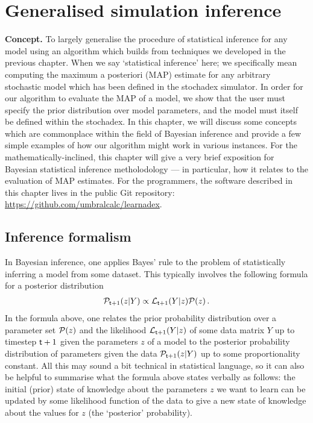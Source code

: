 \chapter{\sffamily Generalised simulation inference}

{\bfseries\sffamily Concept.} To largely generalise the procedure of statistical inference for any model using an algorithm which builds from techniques we developed in the previous chapter. When we say `statistical inference' here; we specifically mean computing the maximum a posteriori (MAP) estimate for any arbitrary stochastic model which has been defined in the stochadex simulator. In order for our algorithm to evaluate the MAP of a model, we show that the user must specify the prior distribution over model parameters, and the model must itself be defined within the stochadex. In this chapter, we will discuss some concepts which are commonplace within the field of Bayesian inference and provide a few simple examples of how our algorithm might work in various instances. For the mathematically-inclined, this chapter will give a very brief exposition for Bayesian statistical inference metholodology --- in particular, how it relates to the evaluation of MAP estimates. For the programmers, the software described in this chapter lives in the public Git repository: \href{https://github.com/umbralcalc/learnadex}{https://github.com/umbralcalc/learnadex}.


\section{\sffamily Inference formalism}

In Bayesian inference, one applies Bayes' rule to the problem of statistically inferring a model from some dataset. This typically involves the following formula for a posterior distribution
\begin{align}
{\cal P}_{{\sf t}+1}(z \vert Y) \propto {\cal L}_{{\sf t}+1}(Y\vert z){\cal P} (z) \label{eq:bayes-rule} \,.
\end{align}
In the formula above, one relates the prior probability distribution over a parameter set ${\cal P} (z)$ and the likelihood ${\cal L}_{{\sf t}+1}(Y\vert z)$  of some data matrix $Y$ up to timestep ${\sf t}+1$ given the parameters $z$ of a model to the posterior probability distribution of parameters given the data ${\cal P}_{{\sf t}+1}(z \vert Y)$ up to some proportionality constant. All this may sound a bit technical in statistical language, so it can also be helpful to summarise what the formula above states verbally as follows: the initial (prior) state of knowledge about the parameters $z$ we want to learn can be updated by some likelihood function of the data to give a new state of knowledge about the values for $z$ (the `posterior' probability). 

